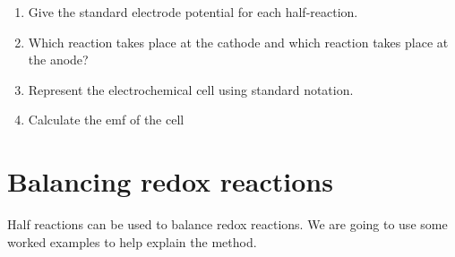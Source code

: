 {\begin{enumerate}
	\begin{enumerate}
	\item{Give the standard electrode potential for each half-reaction.}
	\item{Which reaction takes place at the cathode and which reaction takes place at the anode?}
	\item{Represent the electrochemical cell using standard notation.}
	\item{Calculate the emf of the cell}
	\end{enumerate}

\end{enumerate}


}






\section{Balancing redox reactions}
\label{sec:electrochemical:balancing}

Half reactions can be used to balance redox reactions. We are going to use some worked examples to help explain the method.

